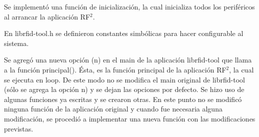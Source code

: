 \documentclass[%
        final,
        notitlepage,
        narroweqnarray,
        inline,
        ]{ieee}
\begin{document}
%




Se implementó una función de inicialización, la cual inicializa todos los periféricos al arrancar la aplicación RF$^{2}$.

En librfid-tool.h se definieron constantes simbólicas para hacer configurable al sistema. 
%

%
%
%
%
%
%
%
%
%
%


Se agregó una nueva opción (n) en el main de la aplicación librfid-tool que llama a la función principal(). Ésta, es la función principal de la aplicación RF$^{2}$, la cual se ejecuta en loop.
De este modo no se modifica el main original de librfid-tool (sólo se agrega la opción n) y se dejan las opciones por defecto.
Se hizo uso de algunas funciones ya escritas y se crearon otras. En este punto no se modificó ninguna función de la aplicación original y cuando fue necesaria alguna modificación, se procedió a implementar una nueva función con las modificaciones previstas.
%



\end{document}
